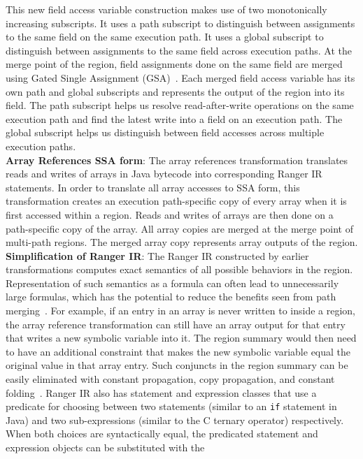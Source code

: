 %
This new field access variable construction makes use of two monotonically increasing subscripts.
%
It uses a path subscript to distinguish between assignments to the same field on the same execution path.
%
It uses a global subscript to distinguish between assignments to the same field across execution paths.
%
At the merge point of the region, field assignments done on the same field are merged using
Gated Single Assignment (GSA)~\cite{Ottenstein1990}.
%
Each merged field access variable has its own path and global subscripts and represents the output of the region into
its field.
%
The path subscript helps us resolve read-after-write operations on the same execution path and find the latest write
into a field on an execution path.
%
The global subscript helps us distinguish between field accesses across multiple execution paths. \\
\textbf{Array References SSA form}: The array references transformation translates reads and writes of arrays in
Java bytecode into corresponding Ranger IR statements.
%
In order to translate all array accesses to SSA form, this transformation creates an execution path-specific copy of
every array when it is first accessed within a region.
%
Reads and writes of arrays are then done on a path-specific copy of the array.
%
All array copies are merged at the merge point of multi-path regions.
%
The merged array copy represents array outputs of the region.\\
\textbf{Simplification of Ranger IR}: The Ranger IR constructed by earlier transformations computes exact semantics
of all possible behaviors in the region.
%
Representation of such semantics as a formula can often lead to unnecessarily large formulas, which has the potential to
reduce the benefits seen from path merging~\cite{angr}.
%
For example, if an entry in an array is never written to inside a region, the array reference transformation can still have an
array output for that entry that writes a new symbolic variable into it.
%
The region summary would then need to have an additional constraint that makes the new symbolic variable equal the
original value in that array entry.
%
Such conjuncts in the region summary can be easily eliminated with constant propagation, copy propagation, and constant
folding~\cite{dragon-book}.
%
Ranger IR also has statement and expression classes that use a predicate for choosing between two statements (similar to
an {\tt if} statement in Java) and two sub-expressions (similar to the C ternary operator) respectively.
%
When both choices are syntactically equal, the predicated statement and expression objects can be substituted with the
